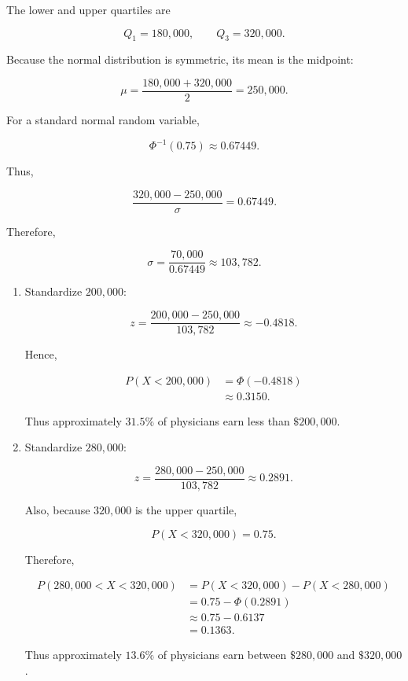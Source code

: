 \documentclass[11pt]{article}
\newenvironment{solution}{
    \par
    \begin{tcolorbox}[
        colback=white,
        colframe=uwgold,
        boxrule=0.7pt,
        arc=2mm,
        left=3mm,
        right=3mm,
        top=2mm,
        bottom=2mm,
        breakable,
        before skip=0.5em,
        after skip=1em,
        title=\textbf{Solution},
        coltitle=uwpurple,
        fonttitle=\bfseries
    ]
}{
    \end{tcolorbox}
}
\begin{document}
\begin{solution}

The lower and upper quartiles are

\[
Q_1=180{,}000,
\qquad
Q_3=320{,}000.
\]

Because the normal distribution is symmetric, its mean is the midpoint:

\[
\mu
=
\frac{180{,}000+320{,}000}{2}
=
250{,}000.
\]

For a standard normal random variable,

\[
\Phi^{-1}(0.75)\approx0.67449.
\]

Thus,

\[
\frac{320{,}000-250{,}000}{\sigma}
=
0.67449.
\]

Therefore,

\[
\sigma
=
\frac{70{,}000}{0.67449}
\approx
103{,}782.
\]

\begin{enumerate}[label=(\alph*)]

\item Standardize \(200{,}000\):

\[
z
=
\frac{200{,}000-250{,}000}{103{,}782}
\approx
-0.4818.
\]

Hence,

\[
\begin{aligned}
P(X<200{,}000)
&=
\Phi(-0.4818)\\
&\approx
 {0.3150}.
\end{aligned}
\]

Thus approximately \(31.5\%\) of physicians earn less than
\(\$200{,}000\).

\item Standardize \(280{,}000\):

\[
z
=
\frac{280{,}000-250{,}000}{103{,}782}
\approx
0.2891.
\]

Also, because \(320{,}000\) is the upper quartile,

\[
P(X<320{,}000)=0.75.
\]

Therefore,

\begin{align*}
P(280{,}000<X<320{,}000)
&=
P(X<320{,}000)-P(X<280{,}000)\\
&=
0.75-\Phi(0.2891)\\
&\approx
0.75-0.6137\\
&=
 {0.1363}.
\end{align*}

Thus approximately \(13.6\%\) of physicians earn between
\(\$280{,}000\) and \(\$320{,}000\).

\end{enumerate}

\end{solution}
 
\end{document}
